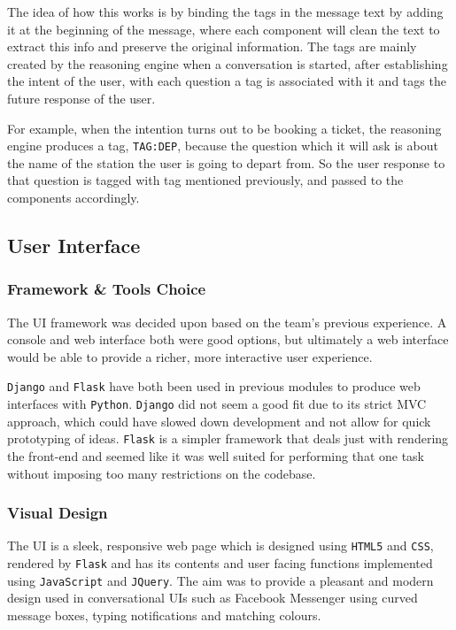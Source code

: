 \documentclass[11pt]{article}
\newcommand{\code}[1]{{\texttt{#1}}}
\begin{document}
        The idea of how this works is by binding the tags in the message text by adding it at the beginning of the message, where each component will clean the text to extract this info and preserve the original information. The tags are mainly created by the reasoning engine when a conversation is started, after establishing the intent of the user, with each question a tag is associated with it and tags the future response of the user. 
        
        For example, when the intention turns out to be booking a ticket, the reasoning engine produces a tag, \code{TAG:DEP}, because the question which it will ask is about the name of the station the user is going to depart from. So the user response to that question is tagged with tag mentioned previously, and passed to the components accordingly.

    \subsection{User Interface} 
    
    
        \subsubsection{Framework \& Tools Choice}
        The UI framework was decided upon based on the team’s previous experience. A console and web interface both were good options, but ultimately a web interface would be able to provide a richer, more interactive user experience.
    
        \code{Django} and \code{Flask} have both been used in previous modules to produce web interfaces with \code{Python}. \code{Django} did not seem a good fit due to its strict MVC approach, which could have slowed down development and not allow for quick prototyping of ideas. \code{Flask} is a simpler framework that deals just with rendering the front-end and seemed like it was well suited for performing that one task without imposing too many restrictions on the codebase.
    
        \subsubsection{Visual Design}
        The UI is a sleek, responsive web page which is designed using \code{HTML5} and \code{CSS}, rendered by \code{Flask} and has its contents and user facing functions implemented using \code{JavaScript} and \code{JQuery}. The aim was to provide a pleasant and modern design used in conversational UIs such as Facebook Messenger using curved message boxes, typing notifications and matching colours.
    
\end{document}
